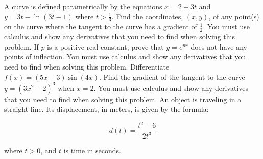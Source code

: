 \documentclass[12pt,addpoints]{exam}
\begin{document}
\begin{questions}
\fillwithlines{5cm}
\question[5] A curve is defined parametrically by the equations \( x = 2 + 3t \) and \( y = 3t - \ln(3t - 1) \) where \( t > \frac{1}{3} \). Find the coordinates, \((x, y)\), of any point(s) on the curve where the tangent to the curve has a gradient of \(\frac{1}{2}\). You must use calculus and show any derivatives that you need to find when solving this problem.
\fillwithlines{5cm}
\question[5] If \( p \) is a positive real constant, prove that \( y = e^{px} \) does not have any points of inflection. You must use calculus and show any derivatives that you need to find when solving this problem.
\fillwithlines{5cm}
\question[5] Differentiate \( f(x) = (5x - 3) \sin(4x) \).
\fillwithlines{5cm}
\question[5] Find the gradient of the tangent to the curve \( y = \left(3x^2 - 2\right)^3 \) when \( x = 2 \). You must use calculus and show any derivatives that you need to find when solving this problem.
\fillwithlines{5cm}
\question[5] An object is traveling in a straight line. Its displacement, in meters, is given by the formula:

\[ d(t) = \frac{t^2 - 6}{2t^3} \]

where \( t > 0 \), and \( t \) is time in seconds.


\end{questions}
\end{document}
